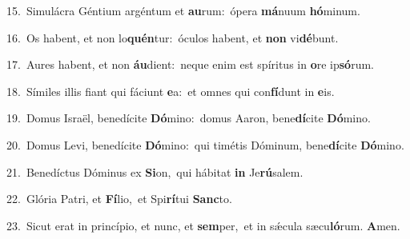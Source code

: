 {\numbfont\textcolor{\numbcolor}{15.}}~Simulácra Géntium argéntum et \textbf{au}\-rum:~\star ópera \textbf{má}\-nuum \textbf{hó}\-minum.\par
{\numbfont\textcolor{\numbcolor}{16.}}~Os habent, et non lo\-\textbf{quén}\-tur:~\star óculos habent, et \textbf{non} vi\-\textbf{dé}\-bunt.\par
{\numbfont\textcolor{\numbcolor}{17.}}~Aures habent, et non \textbf{áu}\-dient:~\star neque enim est spíritus in \textbf{o}\-re ip\-\textbf{só}\-rum.\par
{\numbfont\textcolor{\numbcolor}{18.}}~Símiles illis fiant qui fáciunt \textbf{e}\-a:~\star et omnes qui con\-\textbf{fí}\-dunt in \textbf{e}\-is.\par
{\numbfont\textcolor{\numbcolor}{19.}}~Domus Israël, benedícite \textbf{Dó}\-mino:~\star domus Aaron, bene\-\textbf{dí}\-cite \textbf{Dó}\-mino.\par
{\numbfont\textcolor{\numbcolor}{20.}}~Domus Levi, benedícite \textbf{Dó}\-mino:~\star qui timétis Dóminum, bene\-\textbf{dí}\-cite \textbf{Dó}\-mino.\par
{\numbfont\textcolor{\numbcolor}{21.}}~Benedíctus Dóminus ex \textbf{Si}\-on,~\star qui hábitat \textbf{in} Je\-\textbf{rú}\-salem.\par
{\numbfont\textcolor{\numbcolor}{22.}}~Glória Patri, et \textbf{Fí}\-lio,~\star et Spi\-\textbf{rí}\-tui \textbf{Sanc}\-to.\par
{\numbfont\textcolor{\numbcolor}{23.}}~Sicut erat in princípio, et nunc, et \textbf{sem}\-per,~\star et in sǽcula sæcu\-\textbf{ló}\-rum. \textbf{A}\-men.\par
